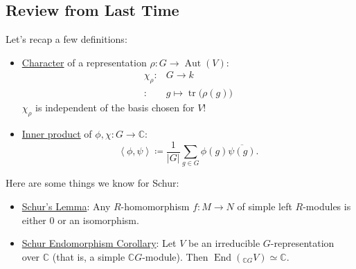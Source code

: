\documentclass[12pt]{article}
\newcommand{\cx}{\mathbb{C}}
\newcommand{\vbrack}[1]{\left \langle #1 \right \rangle}
\theoremstyle{definition}
\DeclareMathOperator\Aut{Aut}
\DeclareMathOperator\End{End}
\DeclareMathOperator\tr{tr}
\begin{document}
\subsection{Review from Last Time}
Let's recap a few definitions: 
\begin{itemize}
    \item \underline{Character} of a representation $\rho : G \to \Aut(V)$:
    \begin{equation}
        \begin{split}
            \chi_{\rho} : & G \to k \\
            : & g \mapsto \tr \big( \rho(g) \big)
        \end{split}
    \end{equation}
    $\chi_{\rho}$ is independent of the basis chosen for $V$!
    \item \underline{Inner product} of $\phi , \chi : G \to \cx$:
    \begin{equation}
        \vbrack{ \phi , \psi } \coloneqq  \frac{1}{|G|} \sum\limits_{g \in G} \phi(g) \overline{\psi(g)}.
    \end{equation}
\end{itemize}
Here are some things we know for Schur: 
\begin{itemize}
    \item \underline{Schur's Lemma}: Any $R$-homomorphism $f : M \to N$ of simple left $R$-modules is either 0 or an isomorphism.
    \item \underline{Schur Endomorphism Corollary}: Let $V$ be an irreducible $G$-representation over $\cx$ (that is, a simple $\cx G$-module). Then $\End(_{\cx G} V) \simeq \cx$.
\end{itemize}
\end{document}
